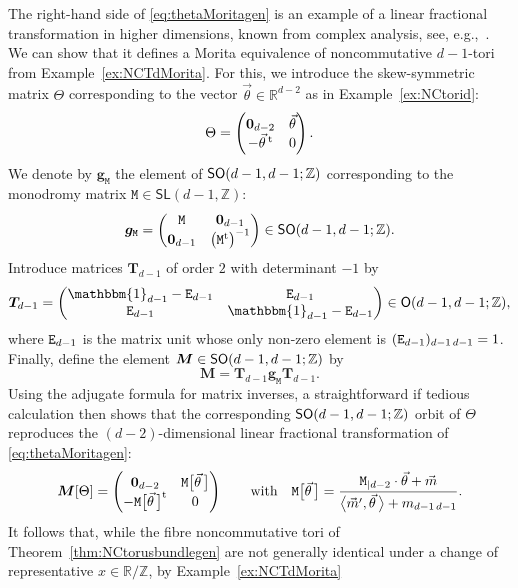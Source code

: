 \documentclass[pdftex]{sigma}
\numberwithin{equation}{section}
\newcommand{\Z}{\zed}
\newcommand{\mbf}[1]{{\boldsymbol {#1} }}
\newcommand{\unit}{\mathbbm{1}} 			%
\newcommand{\sfSL}{\mathsf{SL}}
\newcommand{\ttM}{\mathtt{M}}
\newcommand{\R}{\real}
\newcommand{\zed}{{\mathbb Z}} %
\newcommand{\real}{{\mathbb R}} %
\begin{document}
\begin{Remark}
\label{rem:MoritaKK}
The right-hand side of \eqref{eq:thetaMoritagen} is an example of a
linear fractional transformation in higher dimensions, known from
complex analysis, see, e.g.,~\cite{Cowen2000}. We can show that it defines a Morita equivalence of noncommutative $d{-}1$-tori from
Example~\ref{ex:NCTdMorita}. For this, we introduce the skew-symmetric
matrix $\Theta$ corresponding to the vector $\vec\theta\in\R^{d-2}$ as
in Example~\ref{ex:NCtorid}:
\[
\Theta = \left(
\begin{matrix}
\mbf 0_{d-2} & \vec\theta \\ -\vec\theta\,^{\rm t} & 0
\end{matrix}
\right) .
\]
We denote by $\mbf g_{\ttM}$ the element of ${\sf SO}(d-1,d-1;\Z)$
corresponding to the monodromy matrix $\ttM\in\sfSL(d-1,\Z)$:
\[
\mbf g_{\ttM} = \left(
\begin{matrix}
\ttM & \mbf 0_{d-1} \\ \mbf 0_{d-1} & \big(\ttM^{\rm t}\big)^{-1}
\end{matrix}
\right)
\in {\sf SO}(d-1,d-1;\Z) .
\]
Introduce matrices $\mbf T_{d-1}$ of order $2$ with determinant $-1$
by
\[
\mbf T_{d-1} = \left(
\begin{matrix}
\unit_{d-1}-{\tt E}_{d-1} & {\tt E}_{d-1} \\ {\tt E}_{d-1} &
\unit_{d-1}-{\tt E}_{d-1}
\end{matrix}
\right) \in {\sf O}(d-1,d-1;\Z) ,
\]
where ${\tt E}_{d-1}$ is the matrix unit whose only
non-zero element is $({\tt E}_{d-1})_{d-1\,d-1} = 1$.
Finally, define the element $\mbf M\in{\sf SO}(d-1,d-1;\Z)$ by
\[
\mbf M = \mbf T_{d-1} \mbf g_{\ttM} \mbf T_{d-1} .
\]
Using the adjugate formula
for matrix inverses, a straightforward if tedious calculation then shows that the
corresponding ${\sf SO}(d-1,d-1;\Z)$ orbit of $\Theta$ reproduces the
$(d{-}2)$-dimensional linear fractional transformation of
\eqref{eq:thetaMoritagen}:
\[
\mbf M[\Theta] = \left(
\begin{matrix}
\mbf 0_{d-2} & \ttM\big[\vec\theta\, \big] \\
-\ttM\big[\vec\theta\, \big]^{\rm t} & 0
\end{matrix}
\right) \qquad \mbox{with} \quad \ttM\big[\vec\theta\, \big] = \frac{\ttM_{|d-2}\cdot\vec\theta + \vec m}
{\big\langle \vec m',\vec\theta\, \big\rangle + m_{d-1 \,
 d-1}} .
\]
It follows that, while the fibre noncommutative
tori of Theorem~\ref{thm:NCtorusbundlegen} are not generally identical under a change of
representative $x\in\R/\Z$, by Example~\ref{ex:NCTdMorita}

\end{Remark}
\end{document}
